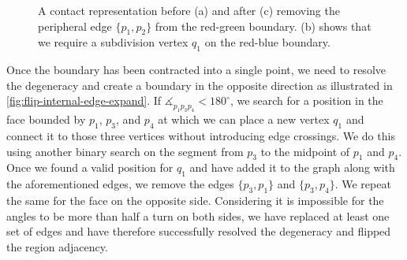 \begin{figure}[H]
	\centering
	\quad
	\quad
	\caption{A contact representation before (a) and after (c) removing the peripheral edge $\{p_1,p_2\}$ from the red-green boundary. (b) shows that we require a subdivision vertex $q_1$ on the red-blue boundary.}
	\label{fig:flip-internal-edge-contract}
\end{figure}

Once the boundary has been contracted into a single point, we need to resolve the degeneracy and create a boundary in the opposite direction as illustrated in \cref{fig:flip-internal-edge-expand}. If $\measuredangle_{p_1p_3p_4} < 180^\circ$, we search for a position in the face bounded by $p_1$, $p_3$, and $p_4$ at which we can place a new vertex $q_1$ and connect it to those three vertices without introducing edge crossings. We do this using another binary search on the segment from $p_3$ to the midpoint of $p_1$ and $p_4$. Once we found a valid position for $q_1$ and have added it to the graph along with the aforementioned edges, we remove the edges $\{p_3,p_1\}$ and $\{p_3,p_4\}$. We repeat the same for the face on the opposite side. Considering it is impossible for the angles to be more than half a turn on both sides, we have replaced at least one set of edges and have therefore successfully resolved the degeneracy and flipped the region adjacency.

